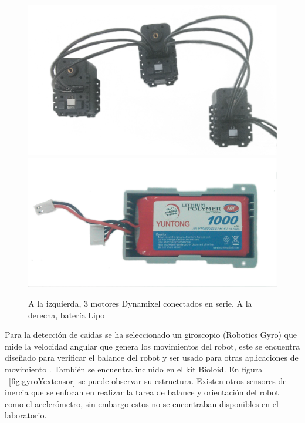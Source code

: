 
\begin{figure}[hbtp]
\centering
\includegraphics[scale=0.08]{imagenes/3Dynamixel.jpg}
\includegraphics[scale=0.08]{imagenes/bateriaLipo.jpg}
\caption{A la izquierda, 3 motores Dynamixel conectados en serie. A la derecha, batería Lipo}
\label{MotorBateria}
\end{figure}


Para la detecci\'on de ca\'idas se ha seleccionado un giroscopio (Robotics Gyro) que mide la velocidad angular que genera los movimientos del robot, este se encuentra diseñado para verificar el balance del robot y ser usado para otras aplicaciones de movimiento \cite{gyro}. También se encuentra incluido en el kit Bioloid. En figura ~\ref{fig:gyroYextensor} se puede observar su estructura. Existen otros sensores de inercia que se enfocan en realizar la tarea de balance y orientaci\'on del robot como el aceler\'ometro, sin embargo estos no se encontraban disponibles en el laboratorio.

